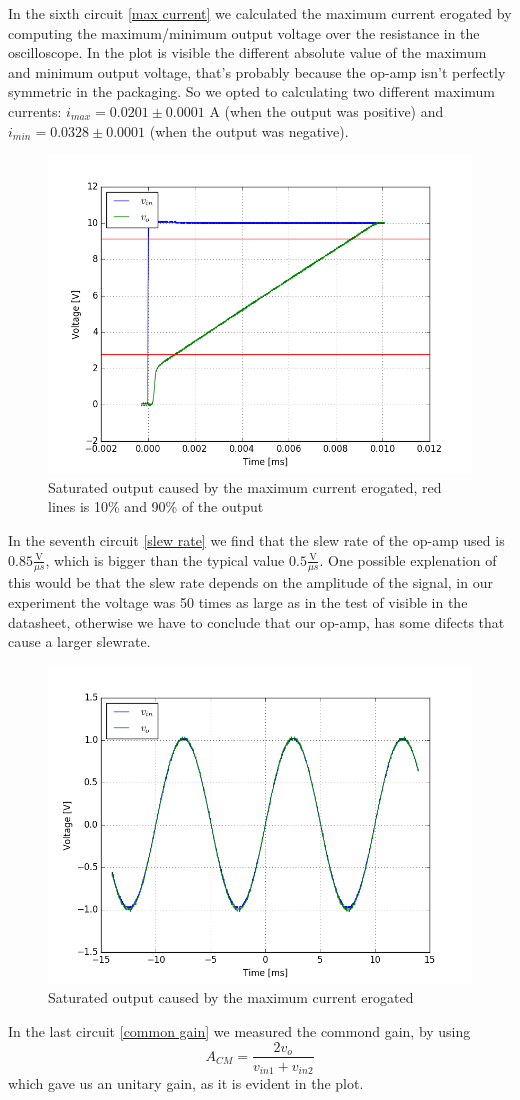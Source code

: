 In the sixth circuit \eqref{max current} we calculated the maximum current erogated by computing the maximum/minimum output voltage over the resistance in the oscilloscope. In the plot is visible the different absolute value of the maximum and minimum output voltage, that's probably because the op-amp isn't perfectly symmetric in the packaging. So we opted to calculating two different maximum currents: $i_{max} = 0.0201 \pm 0.0001$ A (when the output was positive) and $i_{min} = 0.0328 \pm 0.0001$ (when the output was negative).
\begin{figure}[H]
\centering
\includegraphics[width=.6\textwidth]{3/Slew_Ratio.png}
\caption{Saturated output caused by the maximum current erogated, red lines is 10\% and 90\% of the output}
\end{figure}
In the seventh circuit \eqref{slew rate} we find that the slew rate of the op-amp used is $0.85 \frac{\text{V}}{\mu s}$, which is bigger than the typical value $0.5 \frac{\text{V}}{\mu s}$. One possible explenation of this would be that the slew rate depends on the amplitude of the signal, in our experiment the voltage was 50 times as large as in the test of visible in the datasheet, otherwise we have to conclude that our op-amp, has some difects that cause a larger slewrate.
\begin{figure}[H]
\centering
\includegraphics[width=.7\textwidth]{3/Amplification_in_common_mode.png}
\caption{Saturated output caused by the maximum current erogated}
\end{figure}
In the last circuit \eqref{common gain} we measured the commond gain, by using 
\[A_{CM} = \frac{2 v_{o}}{v_{in1} + v_{in2}}\]
which gave us an unitary gain, as it is evident in the plot.
